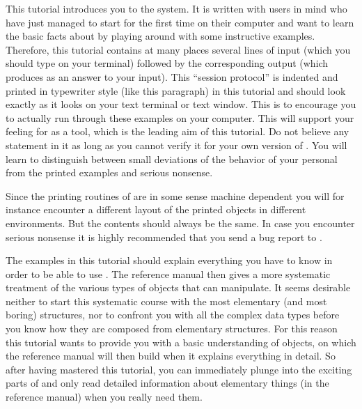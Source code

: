 


This tutorial introduces you to  the {\GAP}  system.  It is written  with
users in mind who have just managed to start {\GAP} for the first time on
their computer and want to learn the basic facts  about {\GAP} by playing
around with some instructive  examples. Therefore, this tutorial contains
at many  places several lines of  input  (which you  should type  on your
terminal) followed by the corresponding output  (which {\GAP} produces as
an answer to your input).
\begintt
This ``session protocol'' is indented and printed in typewriter style
(like this paragraph) in this tutorial and should look exactly as it
looks on your text terminal or text window.
\endtt
This is  to encourage you to actually  run through these examples on your
computer. This will support your  feeling for {\GAP}  as a tool, which is
the leading aim of this  tutorial. Do not believe any  statement in it as
long  as you cannot verify  it for your own  version of  {\GAP}. You will
learn to distinguish  between small  deviations of  the behavior of  your
personal {\GAP} from the printed examples and serious nonsense.

Since the printing routines of {\GAP} are in some sense machine dependent
you will for instance encounter a different layout of the printed objects
in different environments.  But the  contents should always be the  same.
In case you encounter serious nonsense  it is highly recommended that you
send a bug report to .

The  examples in this  tutorial should explain  everything you have to
know in order  to be able  to use {\GAP}.   The reference  manual then
gives a more systematic treatment of the various types of objects that
{\GAP} can manipulate.   It   seems desirable neither to    start this
systematic  course  with  the   most   elementary (and  most   boring)
structures, nor to confront you with all the complex data types before
you know how  they are composed from  elementary structures.  For this
reason this tutorial  wants to provide  you with a basic understanding
of {\GAP} objects, on which the reference  manual will then build when
it  explains everything in  detail.   So  after having mastered   this
tutorial, you can immediately plunge into the exciting parts of {\GAP}
and  only read detailed  information about  elementary things (in  the
reference manual) when you really need them.

